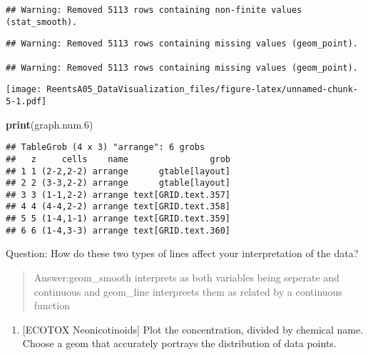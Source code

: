 \documentclass[]{article}
\newenvironment{Shaded}{\begin{snugshade}}{\end{snugshade}}
\newcommand{\KeywordTok}[1]{\textcolor[rgb]{0.13,0.29,0.53}{\textbf{#1}}}
\newcommand{\DataTypeTok}[1]{\textcolor[rgb]{0.13,0.29,0.53}{#1}}
\newcommand{\DecValTok}[1]{\textcolor[rgb]{0.00,0.00,0.81}{#1}}
\newcommand{\StringTok}[1]{\textcolor[rgb]{0.31,0.60,0.02}{#1}}
\newcommand{\CommentTok}[1]{\textcolor[rgb]{0.56,0.35,0.01}{\textit{#1}}}
\newcommand{\OperatorTok}[1]{\textcolor[rgb]{0.81,0.36,0.00}{\textbf{#1}}}
\newcommand{\NormalTok}[1]{#1}
\providecommand{\tightlist}{%
  \setlength{\itemsep}{0pt}\setlength{\parskip}{0pt}}
\begin{document}
\begin{verbatim}
## Warning: Removed 5113 rows containing non-finite values (stat_smooth).
\end{verbatim}

\begin{verbatim}
## Warning: Removed 5113 rows containing missing values (geom_point).

## Warning: Removed 5113 rows containing missing values (geom_point).
\end{verbatim}

\texttt{[image: ReentsA05\_DataVisualization\_files/figure-latex/unnamed-chunk-5-1.pdf]}

\begin{Shaded}
\begin{Highlighting}[]
\KeywordTok{print}\NormalTok{(graph.num.}\DecValTok{6}\NormalTok{)}
\end{Highlighting}
\end{Shaded}

\begin{verbatim}
## TableGrob (4 x 3) "arrange": 6 grobs
##   z     cells    name                grob
## 1 1 (2-2,2-2) arrange      gtable[layout]
## 2 2 (3-3,2-2) arrange      gtable[layout]
## 3 3 (1-1,2-2) arrange text[GRID.text.357]
## 4 4 (4-4,2-2) arrange text[GRID.text.358]
## 5 5 (1-4,1-1) arrange text[GRID.text.359]
## 6 6 (1-4,3-3) arrange text[GRID.text.360]
\end{verbatim}

Question: How do these two types of lines affect your interpretation of
the data?

\begin{quote}
Answer:geom\_smooth interprets as both variables being seperate and
continuous and geom\_line interpreets them as related by a continuous
function
\end{quote}

\begin{enumerate}
\def\labelenumi{\arabic{enumi}.}
\setcounter{enumi}{6}
\tightlist
\item
  {[}ECOTOX Neonicotinoids{]} Plot the concentration, divided by
  chemical name. Choose a geom that accurately portrays the distribution
  of data points.
\end{enumerate}

\begin{Shaded}
\end{Shaded}
\end{document}
